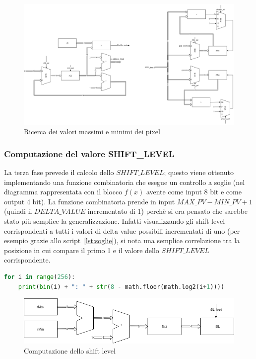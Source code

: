\documentclass[11pt]{article} %
\begin{document}
\begin{figure}[h]
\centering
\includegraphics[width=120mm]{../datapaths/regMax_regMin.png}
\caption{Ricerca dei valori massimi e minimi dei pixel}
\end{figure}


\subsubsection{Computazione del valore SHIFT\_LEVEL}
La terza fase prevede il calcolo dello $SHIFT\_LEVEL$; questo viene ottenuto implementando una funzione combinatoria che esegue un controllo a soglie (nel diagramma rappresentata con il blocco $f(x)$ avente come input 8 bit e come output 4 bit). La funzione combinatoria prende in input $MAX\_PV - MIN\_PV + 1$ (quindi il $DELTA\_VALUE$ incrementato di 1) perchè si era pensato che sarebbe stato più semplice la generalizzazione. Infatti visualizzando gli shift level corrispondenti a tutti i valori di delta value possibili incrementati di uno (per esempio grazie allo script~\ref{lst:soglie}), si nota una semplice correlazione tra la posizione in cui compare il primo 1 e il valore dello $SHIFT\_LEVEL$ corrispondente.

\begin{lstlisting}[language=Python, caption=Generazione di soglie, label={lst:soglie}]
for i in range(256):
	print(bin(i) + ": " + str(8 - math.floor(math.log2(i+1))))
\end{lstlisting}

\begin{figure}[h]
\centering
\includegraphics[width=120mm]{../datapaths/regSL_final.png}
\caption{Computazione dello shift level}
\end{figure}
\end{document}
